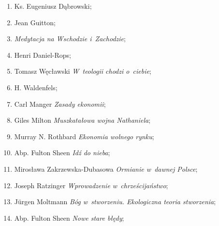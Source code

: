\documentclass[a4paper,11pt]{article}
\begin{document}
\begin{enumerate}
\item Ks. Eugeniusz Dąbrowski;



\item Jean Guitton;



\item \textit{Medytacja na Wschodzie i~Zachodzie};



\item Henri Daniel-Rops;



\item Tomasz Węcławski \textit{W~teologii chodzi o~ciebie};



\item H. Waldenfels;



\item Carl Manger \textit{Zasady ekonomii};



\item Giles Milton \textit{Muszkatałowa wojna Nathaniela};



\item Murray N. Rothbard \textit{Ekonomia wolnego rynku};



\item Abp. Fulton Sheen \textit{Idź do nieba};



\item Mirosława Zakrzewska-Dubasowa \textit{Ormianie w~dawnej Polsce};



\item Joseph Ratzinger \textit{Wprowadzenie w~chrześcijaństwo};



\item J\"{u}rgen Moltmann \textit{Bóg w~stworzeniu. Ekologiczna teoria
    stworzenia};



\item Abp. Fulton Sheen \textit{Nowe stare błędy};

\end{enumerate}
\end{document}

